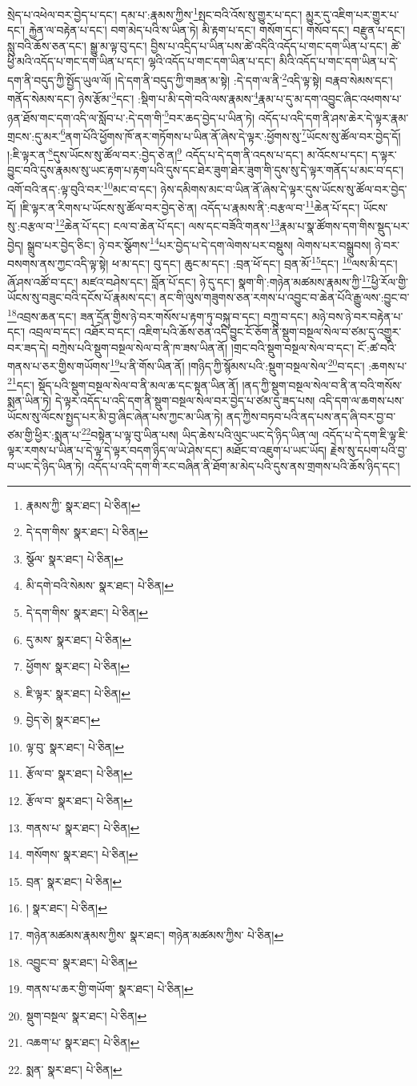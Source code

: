 སྲེད་པ་འཕེལ་བར་བྱེད་པ་དང་། དམ་པ་:རྣམས་ཀྱིས་\footnote{རྣམས་ཀྱི་  སྣར་ཐང་།  པེ་ཅིན། }སྤང་བའི་འོས་སུ་གྱུར་པ་དང་། མྱུར་དུ་འཇིག་པར་གྱུར་པ་དང་། རྐྱེན་ལ་བརྟེན་པ་དང་། བག་མེད་པའི་ས་ཡིན་ཏེ། མི་རྟག་པ་དང་། གསོག་དང་། གསོབ་དང་། བརྫུན་པ་དང་། སླུ་བའི་ཆོས་ཅན་དང་། སྒྱུ་མ་ལྟ་བུ་དང་། བྱིས་པ་འདྲིད་པ་ཡིན་པས་ཚེ་འདིའི་འདོད་པ་གང་དག་ཡིན་པ་དང་། ཚེ་ཕྱི་མའི་འདོད་པ་གང་དག་ཡིན་པ་དང་། ལྷའི་འདོད་པ་གང་དག་ཡིན་པ་དང་། མིའི་འདོད་པ་གང་དག་ཡིན་པ་དེ་དག་ནི་བདུད་ཀྱི་སྤྱོད་ཡུལ་ལོ། །དེ་དག་ནི་བདུད་ཀྱི་གཟན་མ་སྟེ། :དེ་དག་ལ་ནི་\footnote{དེ་དག་གིས་  སྣར་ཐང་།  པེ་ཅིན། }འདི་ལྟ་སྟེ། བརྣབ་སེམས་དང་། གནོད་སེམས་དང་། ཉེས་རྩོམ་\footnote{སྩོལ་  སྣར་ཐང་།  པེ་ཅིན། }དང་། :སྡིག་པ་མི་དགེ་བའི་ལས་རྣམས་\footnote{མི་དགེ་བའི་སེམས་  སྣར་ཐང་།  པེ་ཅིན། }རྣམ་པ་དུ་མ་དག་འབྱུང་ཞིང་འཕགས་པ་ཉན་ཐོས་གང་དག་འདི་ལ་སློབ་པ་:དེ་དག་གི་\footnote{དེ་དག་གིས་  སྣར་ཐང་།  པེ་ཅིན། }བར་ཆད་བྱེད་པ་ཡིན་ཏེ། འདོད་པ་འདི་དག་ནི་ཤས་ཆེར་དེ་ལྟར་རྣམ་གྲངས་:དུ་མར་\footnote{དུ་མས་  སྣར་ཐང་།  པེ་ཅིན། }ནག་པོའི་ཕྱོགས་ཁོ་ནར་གཏོགས་པ་ཡིན་ནོ་ཞེས་དེ་ལྟར་:ཕྱོགས་སུ་\footnote{ཕྱོགས་  སྣར་ཐང་།  པེ་ཅིན། }ཡོངས་སུ་ཚོལ་བར་བྱེད་དོ། །:ཇི་ལྟར་ན་\footnote{ཇི་ལྟར་  སྣར་ཐང་།  པེ་ཅིན། }དུས་ཡོངས་སུ་ཚོལ་བར་:བྱེད་ཅེ་ན།\footnote{བྱེད་ཅེ།  སྣར་ཐང་། } འདོད་པ་དེ་དག་ནི་འདས་པ་དང་། མ་འོངས་པ་དང་། ད་ལྟར་བྱུང་བའི་དུས་རྣམས་སུ་ཡང་རྟག་པ་རྟག་པའི་དུས་དང་ཐེར་ཟུག་ཐེར་ཟུག་གི་དུས་སུ་དེ་ལྟར་གནོད་པ་མང་བ་དང་། འགོ་བའི་ནད་:ལྟ་བུའི་བར་\footnote{ལྟ་བུ་  སྣར་ཐང་།  པེ་ཅིན། }མང་བ་དང་། ཉེས་དམིགས་མང་བ་ཡིན་ནོ་ཞེས་དེ་ལྟར་དུས་ཡོངས་སུ་ཚོལ་བར་བྱེད་དོ། །ཇི་ལྟར་ན་རིགས་པ་ཡོངས་སུ་ཚོལ་བར་བྱེད་ཅེ་ན། འདོད་པ་རྣམས་ནི་:བརྩལ་བ་\footnote{རྩོལ་བ་  སྣར་ཐང་།  པེ་ཅིན། }ཆེན་པོ་དང་། ཡོངས་སུ་:བརྩལ་བ་\footnote{རྩོལ་བ་  སྣར་ཐང་།  པེ་ཅིན། }ཆེན་པོ་དང་། ངལ་བ་ཆེན་པོ་དང་། ལས་དང་བཟོའི་གནས་\footnote{གནས་པ་  སྣར་ཐང་།  པེ་ཅིན། }རྣམ་པ་སྣ་ཚོགས་དག་གིས་སྡུད་པར་བྱེད། སྒྲུབ་པར་བྱེད་ཅིང་། ཉེ་བར་སྩོགས་\footnote{གསོགས་  སྣར་ཐང་།  པེ་ཅིན། }པར་བྱེད་པ་དེ་དག་ལེགས་པར་བསྡུས། ལེགས་པར་བསྒྲུབས། ཉེ་བར་བསགས་ནས་ཀྱང་འདི་ལྟ་སྟེ། ཕ་མ་དང་། བུ་དང་། ཆུང་མ་དང་། :བྲན་ཕོ་དང་། བྲན་མོ་\footnote{བྲན་  སྣར་ཐང་།  པེ་ཅིན། }དང་། \footnote{།    སྣར་ཐང་།  པེ་ཅིན། }ལས་མི་དང་། ཞོ་ཤས་འཚོ་བ་དང་། མཛའ་བཤེས་དང་། བློན་པོ་དང་། ཉེ་དུ་དང་། སྣག་གི་:གཉེན་མཚམས་རྣམས་ཀྱི་\footnote{གཉེན་མཚམས་རྣམས་ཀྱིས་  སྣར་ཐང་། གཉེན་མཚམས་ཀྱིས་  པེ་ཅིན། }ཕྱི་རོལ་གྱི་ཡོངས་སུ་བཟུང་བའི་དངོས་པོ་རྣམས་དང་། ནང་གི་ལུས་གཟུགས་ཅན་རགས་པ་འབྱུང་བ་ཆེན་པོའི་རྒྱུ་ལས་:བྱུང་བ་\footnote{འབྱུང་བ་  སྣར་ཐང་།  པེ་ཅིན། }འབྲས་ཆན་དང་། ཟན་དྲོན་གྱིས་ཉེ་བར་གསོས་པ་རྟག་ཏུ་བསྐུ་བ་དང་། བཀྲུ་བ་དང་། མཉེ་བས་ཉེ་བར་བརྟེན་པ་དང་། འབྲལ་བ་དང་། འཐོར་བ་དང་། འཇིག་པའི་ཆོས་ཅན་འདི་བྱུང་ངོ་ཅོག་ནི་སྡུག་བསྔལ་སེལ་བ་ཙམ་དུ་འགྱུར་བར་ཟད་དེ། བཀྲེས་པའི་སྡུག་བསྔལ་སེལ་བ་ནི་ཁ་ཟས་ཡིན་ནོ། །གྲང་བའི་སྡུག་བསྔལ་སེལ་བ་དང་། ངོ་:ཚ་བའི་གནས་པ་ཅར་གྱིས་གཡོགས་\footnote{གནས་པ་ཆར་གྱི་གཡོག་  སྣར་ཐང་།  པེ་ཅིན། }པ་ནི་གོས་ཡིན་ནོ། །གཉིད་ཀྱི་སྙོམས་པའི་:སྡུག་བསྔལ་སེལ་\footnote{སྡུག་བསྔལ་  སྣར་ཐང་།  པེ་ཅིན། }བ་དང་། :ཆགས་པ་\footnote{འཆག་པ་  སྣར་ཐང་།  པེ་ཅིན། }དང་། སྡོད་པའི་སྡུག་བསྔལ་སེལ་བ་ནི་མལ་ཆ་དང་སྟན་ཡིན་ནོ། །ནད་ཀྱི་སྡུག་བསྔལ་སེལ་བ་ནི་ན་བའི་གསོས་སྨན་ཡིན་ཏེ། དེ་ལྟར་འདོད་པ་འདི་དག་ནི་སྡུག་བསྔལ་སེལ་བར་བྱེད་པ་ཙམ་དུ་ཟད་པས། འདི་དག་ལ་ཆགས་པས་ཡོངས་སུ་ལོངས་སྤྱད་པར་མི་བྱ་ཞིང་ཞེན་པས་ཀྱང་མ་ཡིན་ཏེ། ནད་ཀྱིས་བཏབ་པའི་ནད་པས་ནད་ཞི་བར་བྱ་བ་ཙམ་གྱི་ཕྱིར་:སྨན་པ་\footnote{སྨན་  སྣར་ཐང་།  པེ་ཅིན། }བསྟེན་པ་ལྟ་བུ་ཡིན་པས། ཡིད་ཆེས་པའི་ལུང་ཡང་དེ་ཉིད་ཡིན་ལ། འདོད་པ་དེ་དག་ཇི་ལྟ་ཇི་ལྟར་རགས་པ་ཡིན་པ་དེ་ལྟ་དེ་ལྟར་བདག་ཉིད་ལ་ཡེ་ཤེས་དང་། མཐོང་བ་འཇུག་པ་ཡང་ཡོད། རྗེས་སུ་དཔག་པའི་བྱ་བ་ཡང་དེ་ཉིད་ཡིན་ཏེ། འདོད་པ་འདི་དག་གི་རང་བཞིན་ནི་ཐོག་མ་མེད་པའི་དུས་ནས་གྲགས་པའི་ཆོས་ཉིད་དང་། 